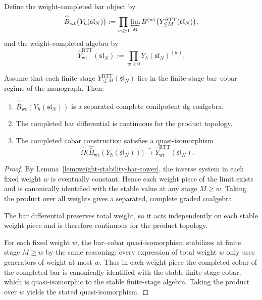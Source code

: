 Define the weight-completed bar object by
\begin{equation}
\widehat{\bar B}_{\mathrm{wt}}\big(Y_\hbar(\mathfrak{sl}_N)\big)
:=
\prod_{w\ge 0}\varprojlim_M \bar B^{(w)}\big(Y^{\mathrm{RTT}}_{\le M}(\mathfrak{sl}_N)\big),
\end{equation}
and the weight-completed algebra by
\begin{equation}
\widehat Y^{\mathrm{RTT}}_{\mathrm{wt}}(\mathfrak{sl}_N)
:=
\prod_{w\ge 0}Y_\hbar(\mathfrak{sl}_N)^{(w)}.
\end{equation}

\begin{theorem}
\ClaimStatusProvedHere
\label{thm:weightwise-MC4-principal-RTT}
Assume that each finite stage
$Y^{\mathrm{RTT}}_{\le M}(\mathfrak{sl}_N)$ lies in the finite-stage
bar--cobar regime of the monograph. Then:
\begin{enumerate}
 \item $\widehat{\bar B}_{\mathrm{wt}}(Y_\hbar(\mathfrak{sl}_N))$ is a
 separated complete conilpotent dg coalgebra.
 \item The completed bar differential is continuous for the product
 topology.
 \item The completed cobar construction satisfies a quasi-isomorphism
 \begin{equation}
 \widehat\Omega\Big(
 \widehat{\bar B}_{\mathrm{wt}}(Y_\hbar(\mathfrak{sl}_N))
 \Big)
 \xrightarrow{\sim}
 \widehat Y^{\mathrm{RTT}}_{\mathrm{wt}}(\mathfrak{sl}_N).
 \end{equation}
\end{enumerate}
\end{theorem}

\begin{proof}
By Lemma~\ref{lem:weight-stability-bar-tower}, the inverse system in each
fixed weight $w$ is eventually constant. Hence each weight piece of the
limit exists and is canonically identified with the stable value at any
stage $M\ge w$. Taking the product over all weights gives a separated,
complete graded coalgebra.

The bar differential preserves total weight, so it acts independently on
each stable weight piece and is therefore continuous for the product
topology.

For each fixed weight $w$, the bar--cobar quasi-isomorphism stabilizes at
finite stage $M\ge w$ by the same reasoning: every expression of total
weight $w$ only uses generators of weight at most $w$. Thus in each
weight piece the completed cobar of the completed bar is canonically
identified with the stable finite-stage cobar, which is quasi-isomorphic
to the stable finite-stage algebra. Taking the product over $w$ yields
the stated quasi-isomorphism.
\end{proof}

